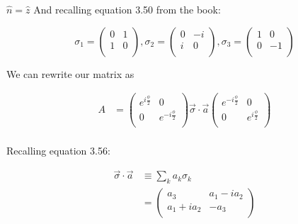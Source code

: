 \begin{answer}
\begin{answerpart}{\texorpdfstring{$\hat{n} = \hat{z}$}{n = z}}
    And recalling equation 3.50 from the book:  
    
    \begin{equation*}
      \tag{3.50}
      \sigma_1 =
      \begin{pmatrix}
        0 & 1 \\
        1 & 0 \\
      \end{pmatrix},
      \sigma_2 =
      \begin{pmatrix}
        0 & -i \\
        i &  0 \\
      \end{pmatrix},
      \sigma_3 =
      \begin{pmatrix}
        1 &  0 \\
        0 & -1 \\
      \end{pmatrix}
    \end{equation*}

    We can rewrite our matrix as

    \begin{equation}
      \begin{split}
        A &=
        \begin{pmatrix}
          e^{i \tfrac \phi 2} & 0\\
          0 & e^{-i \tfrac \phi 2}\\
        \end{pmatrix}
        \vec{\sigma} \cdot \vec{a}
        \begin{pmatrix}
          e^{-i \tfrac \phi 2} & 0\\
          0 & e^{i \tfrac \phi 2}\\
        \end{pmatrix}\\
      \end{split}
    \end{equation}

    Recalling equation 3.56:

    \begin{equation*}
      \tag{3.56}
      \begin{split}
        \vec{\sigma} \cdot \vec{a} &\equiv \sum_k a_k \sigma_k \\
        &= \begin{pmatrix}
          a_3        & a_1 - ia_2 \\
          a_1 + ia_2 & -a_3 \\
        \end{pmatrix}
      \end{split}
    \end{equation*}


\end{answerpart}
\end{answer}
